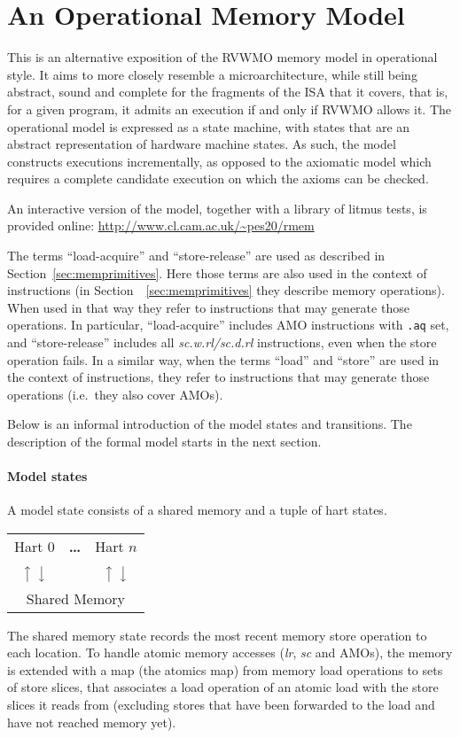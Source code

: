 \section{An Operational Memory Model}
This is an alternative exposition of the RVWMO memory model in operational style.
It aims to more closely resemble a microarchitecture, while still being abstract, sound and complete for the fragments of the ISA that it covers, that is, for a given program, it admits an execution if and only if RVWMO allows it.
The operational model is expressed as a state machine, with states that are an abstract representation of hardware machine states.
As such, the model constructs executions incrementally, as opposed to the axiomatic model which requires a complete candidate execution on which the axioms can be checked.

An interactive version of the model, together with a library of litmus tests,
is provided online: \url{http://www.cl.cam.ac.uk/~pes20/rmem}

The terms ``load-acquire'' and ``store-release'' are used as described in Section~\ref{sec:memprimitives}.
Here those terms are also used in the context of instructions (in Section~~\ref{sec:memprimitives} they describe memory operations).
When used in that way they refer to instructions that may generate those operations.
In particular, ``load-acquire'' includes AMO instructions with {\tt .aq} set, and ``store-release'' includes all {\em sc.w.rl/sc.d.rl} instructions, even when the store operation fails.
In a similar way, when the terms ``load'' and ``store'' are used in the context of instructions, they refer to instructions that may generate those operations (i.e.~they also cover AMOs).

Below is an informal introduction of the model states and transitions.
The description of the formal model starts in the next section.

\paragraph{Model states}
A model state consists of a shared memory and a tuple of hart states.
\begin{center}
\sffamily
\begin{tabular}{ccc}
\cline{1-1}\cline{3-3}
\multicolumn{1}{|c|}{Hart 0} & \bf \dots & \multicolumn{1}{|c|}{Hart $n$} \\
\cline{1-1}\cline{3-3}
$\big\uparrow$ $\big\downarrow$ & & $\big\uparrow$ $\big\downarrow$ \\
\hline
\multicolumn{3}{|c|}{Shared Memory} \\
\hline
\end{tabular}
\end{center}
The shared memory state records the most recent memory store operation to each location.
To handle atomic memory accesses ({\em  lr}, {\em sc} and AMOs), the memory is extended with a map (the atomics map) from memory load operations to sets of store slices, that associates a load operation of an atomic load with the store slices it reads from (excluding stores that have been forwarded to the load and have not reached memory yet).


